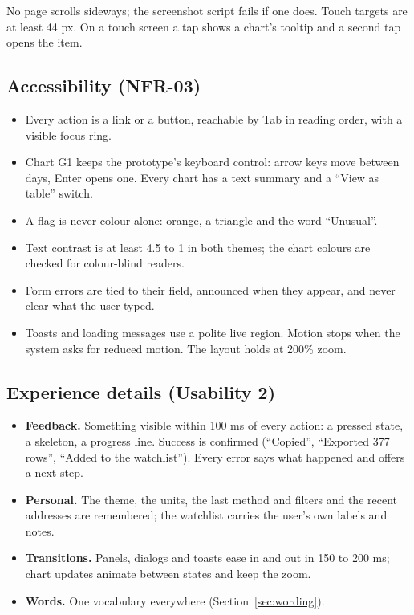 No page scrolls sideways; the screenshot script fails if one does. Touch targets are at least
44 px. On a touch screen a tap shows a chart's tooltip and a second tap opens the item.

\subsection{Accessibility (NFR-03)}
\label{sec:a11y}

\begin{itemize}
  \item Every action is a link or a button, reachable by Tab in reading order, with a visible
    focus ring.
  \item Chart G1 keeps the prototype's keyboard control: arrow keys move between days, Enter
    opens one. Every chart has a text summary and a ``View as table'' switch.
  \item A flag is never colour alone: orange, a triangle and the word ``Unusual''.
  \item Text contrast is at least 4.5 to 1 in both themes; the chart colours are checked for
    colour-blind readers.
  \item Form errors are tied to their field, announced when they appear, and never clear what the
    user typed.
  \item Toasts and loading messages use a polite live region. Motion stops when the system asks
    for reduced motion. The layout holds at 200\% zoom.
\end{itemize}

\subsection{Experience details (Usability 2)}

\begin{itemize}
  \item \textbf{Feedback.} Something visible within 100 ms of every action: a pressed state, a
    skeleton, a progress line. Success is confirmed (``Copied'', ``Exported 377 rows'', ``Added to
    the watchlist''). Every error says what happened and offers a next step.
  \item \textbf{Personal.} The theme, the units, the last method and filters and the recent
    addresses are remembered; the watchlist carries the user's own labels and notes.
  \item \textbf{Transitions.} Panels, dialogs and toasts ease in and out in 150 to 200 ms; chart
    updates animate between states and keep the zoom.
  \item \textbf{Words.} One vocabulary everywhere (Section~\ref{sec:wording}).
\end{itemize}

